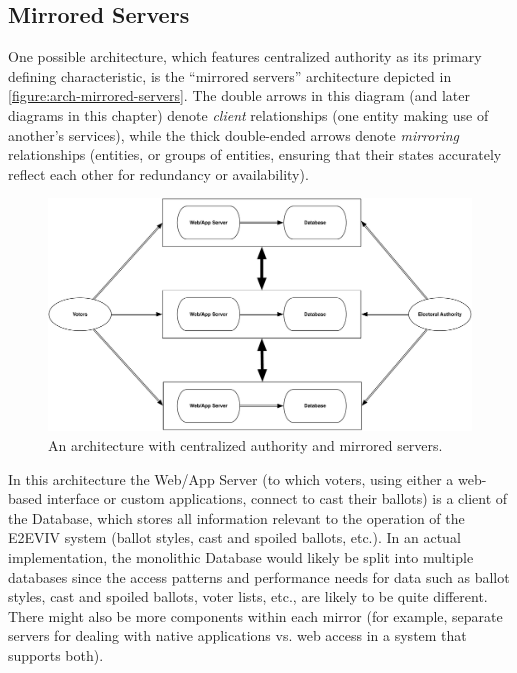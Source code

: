 \subsection{Mirrored Servers}

One possible architecture, which features centralized authority as its
primary defining characteristic, is the ``mirrored servers''
architecture depicted in \autoref{figure:arch-mirrored-servers}. The
double arrows in this diagram (and later diagrams in this chapter)
denote \emph{client} relationships (one entity making use of another's
services), while the thick double-ended arrows denote \emph{mirroring}
relationships (entities, or groups of entities, ensuring that their
states accurately reflect each other for redundancy or availability).

\begin{figure}[t]
\begin{center}
\includegraphics[width=5.5in]{architecture_resources/mirrored-servers.pdf}
\end{center}
\caption{An architecture with centralized authority and mirrored
  servers.}
\label{figure:arch-mirrored-servers}
\end{figure}

In this architecture the Web/App Server (to which voters, using either
a web-based interface or custom applications, connect to cast their
ballots) is a client of the Database, which stores all information
relevant to the operation of the E2EVIV system (ballot styles, cast
and spoiled ballots, etc.). In an actual implementation, the
monolithic Database would likely be split into multiple databases
since the access patterns and performance needs for data such as
ballot styles, cast and spoiled ballots, voter lists, etc., are likely
to be quite different. There might also be more components within each
mirror (for example, separate servers for dealing with native
applications vs. web access in a system that supports both).


